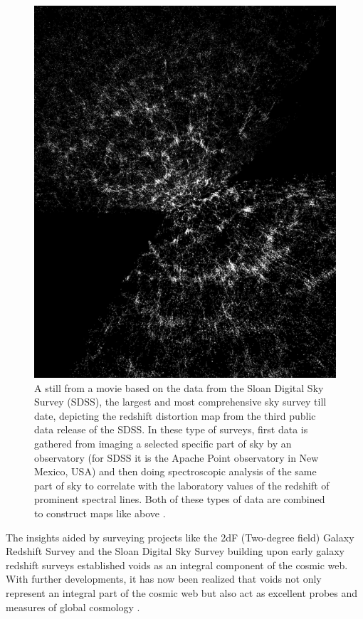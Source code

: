 \documentclass[fleqn,usenatbib]{mnras}
\begin{document}
\begin{figure}
	\centering
	\includegraphics[scale = 0.65]{sdss_redshift}
	\caption{A still from a movie based on the data from the Sloan Digital Sky Survey (SDSS), the largest and most comprehensive sky survey till date, depicting the redshift distortion map from the third public data release of the SDSS. In these type of surveys, first data is gathered from imaging a selected specific part of sky by an observatory (for SDSS it is the Apache Point observatory in New Mexico, USA) and then doing spectroscopic analysis of the same part of sky to correlate with the laboratory values of the redshift of prominent spectral lines. Both of these types of data are combined to construct maps like above \citep{van_de_weygaert_cosmic_2011}.}
	\label{fig:sdss_rdshft}
\end{figure}


The insights aided by surveying projects like the 2dF (Two-degree field) Galaxy Redshift Survey \citep{colless_2df_2001} and the Sloan Digital Sky Survey \citep{tegmark_threedimensional_2004} building upon early galaxy redshift surveys \citep{chincarini_size_1975, gregory_perseuspisces_1978, zeldovich_giant_1982} established voids as an integral component of the cosmic web. With further developments, it has now been realized that voids not only represent an integral part of the cosmic web but also act as excellent probes and measures of global cosmology \citep{van_de_weygaert_voids_2014}.
\end{document}
